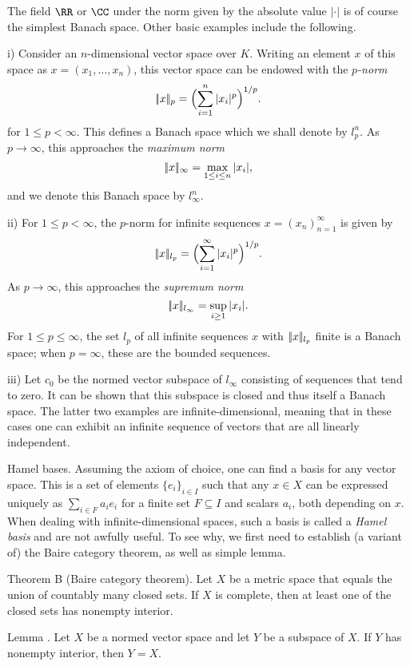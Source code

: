 The field $\RR$ or $\CC$ under the norm given by the absolute value $|\cdot|$ is of course the
simplest Banach space. Other basic examples include the following.
\medskip
\item{i)} Consider an $n$-dimensional vector space over $K$. Writing an element $x$ of this space
as $x = (x_1, \ldots, x_n)$, this vector space can be endowed with the {\it $p$-norm}
$$|\!|x|\!|_p = \Bigl(\sum_{i=1}^n |x_i|^p\Bigr)^{1/p}.$$
for $1\le p<\infty$. This defines a Banach space which we shall denote by $l_p^n$. As $p\to\infty$,
this approaches the {\it maximum norm}
$$|\!|x|\!|_\infty = \max_{1\le i\le n} |x_i|,$$
and we denote this Banach space by $l_\infty^n$.
\smallskip
\item{ii)} For $1\le p< \infty$, the $p$-norm for infinite sequences $x = (x_n)_{n=1}^\infty$ is given by
$$|\!|x|\!|_{l_p} = \Bigl(\sum_{i=1}^\infty |x_i|^p \Bigr)^{1/p}.$$
As $p\to\infty$, this approaches the {\it supremum norm}
$$|\!|x|\!|_{l_\infty} = \sup_{i\ge 1} |x_i|.$$
For $1\le p\le \infty$, the set $l_p$ of all infinite sequences $x$ with $|\!|x|\!|_{l_p}$ finite is a Banach space;
when $p=\infty$, these are the bounded sequences.
\smallskip
\item{iii)} Let $c_0$ be the normed vector subspace of $l_\infty$ consisting of sequences that tend to zero.
It can be shown that this subspace is closed and thus itself a Banach space.
\medskip
The latter two examples are infinite-dimensional, meaning that in these cases one can exhibit an
infinite sequence of vectors that are all linearly independent.

\medskip\boldlabel Hamel bases.
Assuming the axiom of choice, one can
find a basis for any vector space. This is a set of elements $\{e_i\}_{i\in I}$ such that any
$x\in X$ can be expressed uniquely as $\sum_{i\in F} a_ie_i$ for a finite set $F\subseteq I$
and scalars $a_i$, both depending on $x$.
When dealing with infinite-dimensional spaces, such a basis
is called a {\it Hamel basis} and are not awfully useful. To see why, we first need to establish (a variant of)
the Baire category theorem, as well as simple lemma.

\parenproclaim Theorem B (Baire category theorem). Let $X$ be a metric space that equals the union of
countably many closed sets. If $X$ is complete, then at least one of the closed sets has nonempty interior.\slug

\proclaim Lemma \advthm. Let $X$ be a normed vector space and let $Y$ be a subspace of $X$. If $Y$ has nonempty
interior, then $Y=X$.

